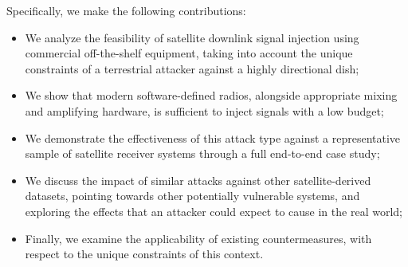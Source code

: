 Specifically, we make the following contributions:

\begin{itemize}
    \item We analyze the feasibility of satellite downlink signal injection using commercial off-the-shelf equipment, taking into account the unique constraints of a terrestrial attacker against a highly directional dish;
    \item We show that modern software-defined radios, alongside appropriate mixing and amplifying hardware, is sufficient to inject signals with a low budget;
    \item We demonstrate the effectiveness of this attack type against a representative sample of satellite receiver systems through a full end-to-end case study;
    \item We discuss the impact of similar attacks against other satellite-derived datasets, pointing towards other potentially vulnerable systems, and exploring the effects that an attacker could expect to cause in the real world;
    \item Finally, we examine the applicability of existing countermeasures, with respect to the unique constraints of this context.
\end{itemize}
